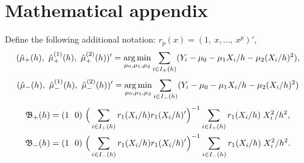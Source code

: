 \documentclass[12pt,fleqn]{article}
\begin{document}
\appendix
\section{Mathematical appendix}

Define the following additional notation:
$r_p(x) = (1,\ x,\dots,\ x^p)'$,
\begin{equation*}
  (\hat{\mu}_{+}(h),\ \hat{\mu}_{+}^{(1)}(h),\ \hat\mu_{+}^{(2)}(h))' =
  \argmin_{\mu_0, \mu_1, \mu_2} \ssum[+]{i}{h} (Y_i - \mu_0 - \mu_1 X_i/h - \mu_2 (X_i/h)^2),
\end{equation*}
\begin{equation*}
(\hat{\mu}_{-}(h),\ \hat{\mu}_{-}^{(1)}(h),\ \hat\mu_{-}^{(2)}(h))' =
  \argmin_{\mu_0, \mu_1, \mu_2} \ssum[-]{i}{h} (Y_i - \mu_0 - \mu_1 X_i/h - \mu_2 (X_i/h)^2) \\
\end{equation*}
\begin{align}
  \label{eq:5}
  \Bf_+(h)
  & = (1\ \  0)\ \Big(\ssum[+]{i}{h} r_1(X_i/h) r_1(X_i/h)' \Big)^{-1}
    \ssum[+]{i}{h} r_1(X_i/h) \; X_i^2 / h^2, \\
  \label{eq:6}
  \Bf_-(h)
  & = (1\ \ 0)\ \Big(\ssum[-]{i}{h} r_1(X_i/h) r_1(X_i/h)' \Big)^{-1}
    \ssum[-]{i}{h} r_1(X_i/h) \; X_i^2 / h^2.
\end{align}
\end{document}
